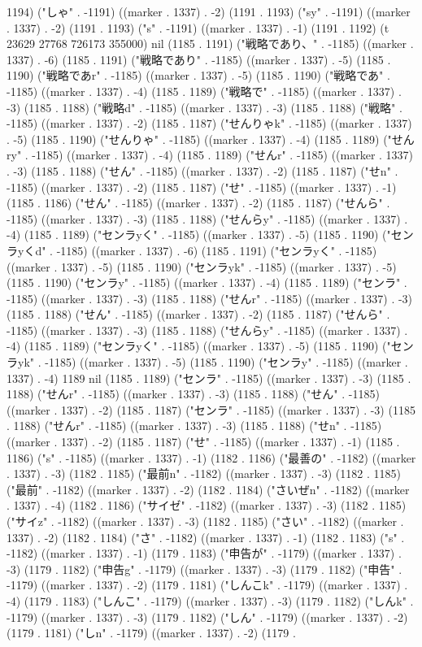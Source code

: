 1194) ("しゃ" . -1191) ((marker . 1337) . -2) (1191 . 1193) ("sy" . -1191) ((marker . 1337) . -2) (1191 . 1193) ("s" . -1191) ((marker . 1337) . -1) (1191 . 1192) (t 23629 27768 726173 355000) nil (1185 . 1191) ("戦略であり、" . -1185) ((marker . 1337) . -6) (1185 . 1191) ("戦略であり" . -1185) ((marker . 1337) . -5) (1185 . 1190) ("戦略であr" . -1185) ((marker . 1337) . -5) (1185 . 1190) ("戦略であ" . -1185) ((marker . 1337) . -4) (1185 . 1189) ("戦略で" . -1185) ((marker . 1337) . -3) (1185 . 1188) ("戦略d" . -1185) ((marker . 1337) . -3) (1185 . 1188) ("戦略" . -1185) ((marker . 1337) . -2) (1185 . 1187) ("せんりゃk" . -1185) ((marker . 1337) . -5) (1185 . 1190) ("せんりゃ" . -1185) ((marker . 1337) . -4) (1185 . 1189) ("せんry" . -1185) ((marker . 1337) . -4) (1185 . 1189) ("せんr" . -1185) ((marker . 1337) . -3) (1185 . 1188) ("せん" . -1185) ((marker . 1337) . -2) (1185 . 1187) ("せn" . -1185) ((marker . 1337) . -2) (1185 . 1187) ("せ" . -1185) ((marker . 1337) . -1) (1185 . 1186) ("せん" . -1185) ((marker . 1337) . -2) (1185 . 1187) ("せんら" . -1185) ((marker . 1337) . -3) (1185 . 1188) ("せんらy" . -1185) ((marker . 1337) . -4) (1185 . 1189) ("センラyく" . -1185) ((marker . 1337) . -5) (1185 . 1190) ("センラyくd" . -1185) ((marker . 1337) . -6) (1185 . 1191) ("センラyく" . -1185) ((marker . 1337) . -5) (1185 . 1190) ("センラyk" . -1185) ((marker . 1337) . -5) (1185 . 1190) ("センラy" . -1185) ((marker . 1337) . -4) (1185 . 1189) ("センラ" . -1185) ((marker . 1337) . -3) (1185 . 1188) ("せんr" . -1185) ((marker . 1337) . -3) (1185 . 1188) ("せん" . -1185) ((marker . 1337) . -2) (1185 . 1187) ("せんら" . -1185) ((marker . 1337) . -3) (1185 . 1188) ("せんらy" . -1185) ((marker . 1337) . -4) (1185 . 1189) ("センラyく" . -1185) ((marker . 1337) . -5) (1185 . 1190) ("センラyk" . -1185) ((marker . 1337) . -5) (1185 . 1190) ("センラy" . -1185) ((marker . 1337) . -4) 1189 nil (1185 . 1189) ("センラ" . -1185) ((marker . 1337) . -3) (1185 . 1188) ("せんr" . -1185) ((marker . 1337) . -3) (1185 . 1188) ("せん" . -1185) ((marker . 1337) . -2) (1185 . 1187) ("センラ" . -1185) ((marker . 1337) . -3) (1185 . 1188) ("せんr" . -1185) ((marker . 1337) . -3) (1185 . 1188) ("せn" . -1185) ((marker . 1337) . -2) (1185 . 1187) ("せ" . -1185) ((marker . 1337) . -1) (1185 . 1186) ("s" . -1185) ((marker . 1337) . -1) (1182 . 1186) ("最善の" . -1182) ((marker . 1337) . -3) (1182 . 1185) ("最前n" . -1182) ((marker . 1337) . -3) (1182 . 1185) ("最前" . -1182) ((marker . 1337) . -2) (1182 . 1184) ("さいぜn" . -1182) ((marker . 1337) . -4) (1182 . 1186) ("サイゼ" . -1182) ((marker . 1337) . -3) (1182 . 1185) ("サイz" . -1182) ((marker . 1337) . -3) (1182 . 1185) ("さい" . -1182) ((marker . 1337) . -2) (1182 . 1184) ("さ" . -1182) ((marker . 1337) . -1) (1182 . 1183) ("s" . -1182) ((marker . 1337) . -1) (1179 . 1183) ("申告が" . -1179) ((marker . 1337) . -3) (1179 . 1182) ("申告g" . -1179) ((marker . 1337) . -3) (1179 . 1182) ("申告" . -1179) ((marker . 1337) . -2) (1179 . 1181) ("しんこk" . -1179) ((marker . 1337) . -4) (1179 . 1183) ("しんこ" . -1179) ((marker . 1337) . -3) (1179 . 1182) ("しんk" . -1179) ((marker . 1337) . -3) (1179 . 1182) ("しん" . -1179) ((marker . 1337) . -2) (1179 . 1181) ("しn" . -1179) ((marker . 1337) . -2) (1179 . 